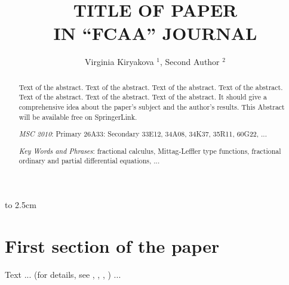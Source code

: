 \documentclass[twoside,reqno,11pt]{fcaa}
\title[TITLE OF PAPER \dots]{TITLE OF PAPER \\ [4pt] IN ``FCAA'' JOURNAL}
\author[V. Kiryakova, S. Author]{Virginia Kiryakova $^1$, Second Author $^2$}
\begin{document}
 \vbox to 2.5cm { \vfill }


 \bigskip \medskip

 \begin{abstract}

Text of the abstract. Text of the abstract. Text of the abstract.
Text of the abstract. Text of the abstract. Text of the abstract.
Text of the abstract. It should give a comprehensive idea about the
paper's subject and the author's results. This Abstract will be
available free on SpringerLink.

 \medskip

{\it MSC 2010\/}: Primary 26A33: Secondary 33E12, 34A08, 34K37,
35R11, 60G22, ...

 \smallskip

{\it Key Words and Phrases}: fractional calculus, Mittag-Leffler
type functions, fractional ordinary and partial differential
equations, ...

 \end{abstract}

 \maketitle

 \vspace*{-16pt}



 \section{First section of the paper}\label{sec:1}

\setcounter{section}{1}
\setcounter{equation}{0}\setcounter{theorem}{0}


Text ... (for details, see \cite{GasRah}, \cite{Rosbl}, \cite{Kir},
\cite{Moak}) ...

\end{document}
